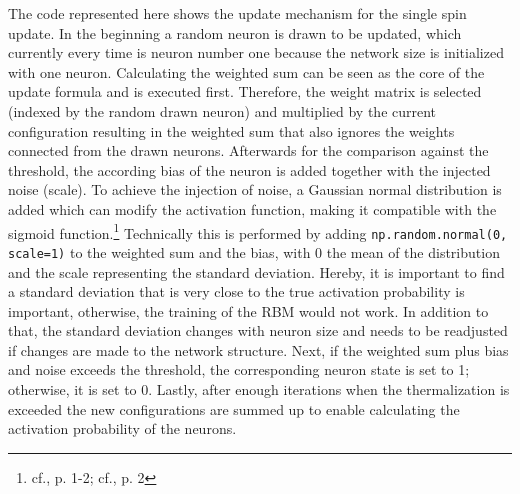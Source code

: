 The code represented here shows the update mechanism for the single spin update. 
In the beginning a random neuron is drawn to be updated, which currently every time is neuron number one because the network size is initialized with one neuron. 
Calculating the weighted sum can be seen as the core of the update formula and is executed first.
Therefore, the weight matrix is selected (indexed by the random drawn neuron) and multiplied by the current configuration resulting in 
the weighted sum that also ignores the weights connected from the drawn neurons.
Afterwards for the comparison against the threshold, the according bias of the neuron is added together with the injected noise (scale).
To achieve the injection of noise, a Gaussian normal distribution is added which can modify the activation function, making it compatible with the sigmoid function.\footnote{cf.\cite{bohmNoiseinjectedAnalogIsing2022}, p. 1-2; cf.\cite{mahmoodiVersatileStochasticDot2019}, p. 2}
Technically this is performed by adding \texttt{np.random.normal(0, scale=1)} to the weighted sum and the bias, with 0  the mean of the distribution and the scale representing the standard deviation. 
Hereby, it is important to find a standard deviation that is very close to the true activation probability is important, otherwise, the training of the RBM would not work.
In addition to that, the standard deviation changes with neuron size and needs to be readjusted if changes are made to the network structure.
Next, if the weighted sum plus bias and noise exceeds the threshold, the corresponding neuron state is set to 1; otherwise, it is set to 0.
Lastly, after enough iterations when the thermalization is exceeded the new configurations
are summed up to enable calculating the activation probability of the neurons. 

